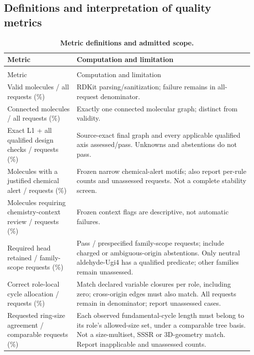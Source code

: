 \subsection{Definitions and interpretation of quality metrics}\label{app:22-metrics}
\begingroup\scriptsize\setlength{\tabcolsep}{2.5pt}\renewcommand{\arraystretch}{1.1}
\begin{longtable}{@{}>{\raggedright\arraybackslash}p{}>{\raggedright\arraybackslash}p{}@{}}
\caption{\textbf{Metric definitions and admitted scope.}}\label{tab:22-metric-definitions}\\
\toprule
Metric & Computation and limitation \\
\midrule\endfirsthead
\multicolumn{2}{l}{Table~\ref{tab:22-metric-definitions}, continued}\\
\toprule
Metric & Computation and limitation \\
\midrule\endhead
\bottomrule\endfoot
Valid molecules / all requests (\%) & RDKit parsing/sanitization; failure remains in all-request denominator. \\
Connected molecules / all requests (\%) & Exactly one connected molecular graph; distinct from validity. \\
Exact L1 + all qualified design checks / requests (\%) & Source-exact final graph and every applicable qualified axis assessed/pass. Unknowns and abstentions do not pass. \\
Molecules with a justified chemical alert / requests (\%) & Frozen narrow chemical-alert motifs; also report per-rule counts and unassessed requests. Not a complete stability screen. \\
Molecules requiring chemistry-context review / requests (\%) & Frozen context flags are descriptive, not automatic failures. \\
Required head retained / family-scope requests (\%) & Pass / prespecified family-scope requests; include charged or ambiguous-origin abstentions. Only neutral aldehyde-Ugi4 has a qualified predicate; other families remain unassessed. \\
Correct role-local cycle allocation / requests (\%) & Match declared variable closures per role, including zero; cross-origin edges must also match. All requests remain in denominator; report unassessed cases. \\
Requested ring-size agreement / comparable requests (\%) & Each observed fundamental-cycle length must belong to its role's allowed-size set, under a comparable tree basis. Not a size-multiset, SSSR or 3D-geometry match. Report inapplicable and unassessed counts. \\

\end{longtable}
